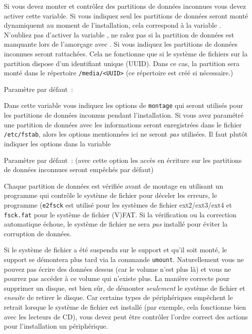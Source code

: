 \begin{description}

    Si vous devez monter et contrôlez des partitions de données inconnues vous
	devez activer cette variable. Si vous indiquez  seul
	les partitions de données seront monté dynamiquemt au moment de l'installation, cela
	correspond à la variable . N'oubliez pas d'activer la variable
	, ne ralez pas si la partition de données est manquante
	lors de l'amorçage avec . Si vous indiquez 
	les partitions de données inconnues seront rattachées. Cela ne fonctionne que si
	le système de fichiers sur la partition dispose d'un identifiant unique (UUID). Dans ce
	cas, la partition sera monté dans le répertoire \texttt{/media/<UUID>} (ce répertoire est
	créé si nécessaire.)

    Paramètre par défaut~: 


    Dans cette variable vous indiquez les options de \texttt{montage} qui
	seront utilisés pour les partitions de données inconnus pendant l'installation.
	Si vous avez paramétré une partition de données avec  les
	informations seront enregistrées dans le fichier \texttt{/etc/fstab}, alors
	les options mentionnées ici ne seront \emph{pas} utilisées. Il faut plutôt
	indiquer les options dans la variable 

    Paramètre par défaut~:  (avec cette option
	les accès en écriture sur les partitions de données inconnues seront empêchés
	par défaut)

\end{description}

    Chaque partition de données est vérifiée avant de montage en utilisant un
	programme qui contrôle le système de fichier pour déceler les erreurs, le programme
	(\texttt{e2fsck} est utilisé pour les systèmes de fichier ext2/ext3/ext4 et
	\texttt{fsck.fat} pour le système de fichier (V)FAT. Si la vérification ou
	la correction automatique échoue, le système de fichier ne sera \emph{pas} installé
	pour éviter la corruption de données.
	
	Si le système de fichier a été suspendu sur le support et qu'il soit monté, le
	support se démontera plus tard via la commande \texttt{umount}. Naturellement
	vous ne pouvez pas écrire des données dessus (car le volume n'est plus là) et vous ne
	pourrez pas accéder à ce volume qui n'existe plus. La manière correcte pour supprimer
	un disque, est bien sûr, de démonter \emph{seulement} le système de fichier et
	\emph{ensuite} de retirer le disque. Car certains types de périphériques empêchent
	le retrait lorsque le système de fichier est installé (par exemple, cela fonctionne
	bien avec les lecteurs de CD), vous devez peut être contrôler l'ordre correct des actions
	pour l'installation un périphérique.

